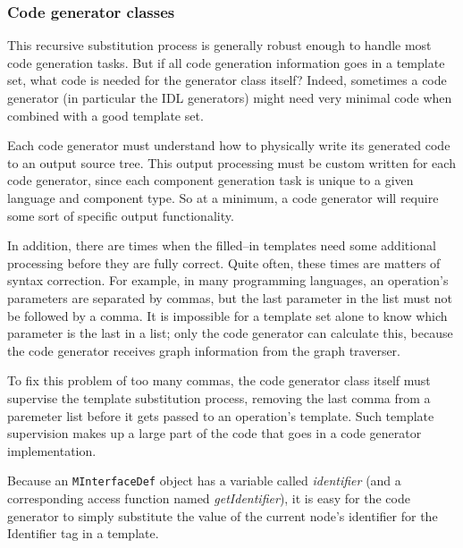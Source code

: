 \subsubsection{Code generator classes}

This recursive substitution process is generally robust enough to handle most
code generation tasks. But if all code generation information goes in a template
set, what code is needed for the generator class itself? Indeed, sometimes a
code generator (in particular the IDL generators) might need very minimal code
when combined with a good template set.

Each code generator must understand how to physically write its generated code
to an output source tree. This output processing must be custom written for each
code generator, since each component generation task is unique to a given
language and component type. So at a minimum, a code generator will require some
sort of specific output functionality.

In addition, there are times when the filled--in templates need some additional
processing before they are fully correct. Quite often, these times are matters
of syntax correction. For example, in many programming languages, an operation's
parameters are separated by commas, but the last parameter in the list must not
be followed by a comma. It is impossible for a template set alone to know which
parameter is the last in a list; only the code generator can calculate this,
because the code generator receives graph information from the graph traverser.

To fix this problem of too many commas, the code generator class itself must
supervise the template substitution process, removing the last comma from a
paremeter list before it gets passed to an operation's template. Such template
supervision makes up a large part of the code that goes in a code generator
implementation.
















Because an {\tt MInterfaceDef} object has a variable called {\it identifier\/}
(and a corresponding access function named {\it getIdentifier\/}), it is easy
for the code generator to simply substitute the value of the current node's
identifier for the {\sf Identifier} tag in a template.

